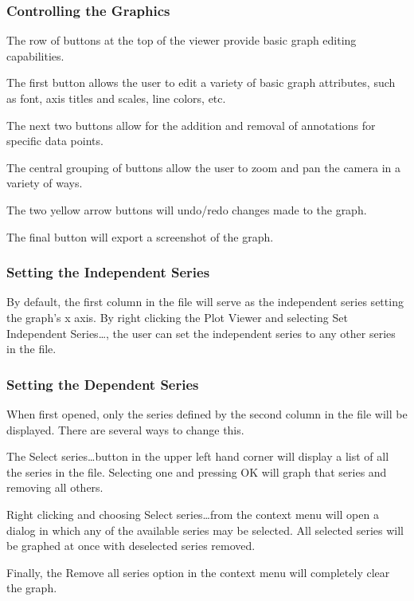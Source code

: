 \documentclass{article}
\begin{document}
\subsubsection{Controlling the Graphics}

The row of buttons at the top of the viewer provide basic graph editing
capabilities.

The first button allows the user to edit a variety of basic graph attributes,
such as font, axis titles and scales, line colors, etc.

The next two buttons allow for the addition and removal of annotations for
specific data points. 

The central grouping of buttons allow the user to zoom and pan the camera in a
variety of ways. 

The two yellow arrow buttons will undo/redo changes made to the graph.

The final button will export a screenshot of the graph.

\subsubsection{Setting the Independent Series}

By default, the first column in the file will serve as the independent series
setting the graph's x axis. By right clicking the Plot Viewer and selecting Set
Independent Series\ldots, the user can set the independent series to any other
series in the file.

\subsubsection{Setting the Dependent Series}

When first opened, only the series defined by the second column in the file will
be displayed. There are several ways to change this. 

The Select series\ldots button in the upper left hand corner will display a list
of all the series in the file. Selecting one and pressing OK will graph that
series and removing all others.

Right clicking and choosing Select series\ldots from the context menu will open
a dialog in which any of the available series may be selected. All selected
series will be graphed at once with deselected series removed.

Finally, the Remove all series option in the context menu will completely clear
the graph.
\end{document}
